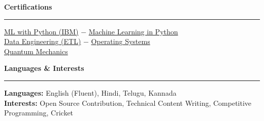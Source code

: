 \documentclass[10pt,letterpaper]{article}
\newcommand{\sectionheader}[1]{%
    \vspace{5pt}
    \textbf{\large #1}
    \vspace{-8pt}
    \par\noindent\rule{\textwidth}{0.4pt}\vspace{3pt}
}
\begin{document}
\sectionheader{Certifications}
\href{https://coursera.org/verify/7M3WRAJNI9TW}{ML with Python (IBM)} \quad $-$ \quad \href{https://coursera.org/verify/OM9A7NEWQT8I}{Machine Learning in Python}\\[3pt]
\href{https://coursera.org/verify/Q866X9O2C7FT}{Data Engineering (ETL)} \quad $-$ \quad \href{https://coursera.org/verify/42DE6OZQR2XY}{Operating Systems}\\[3pt]
\href{https://coursera.org/verify/FX2ZKGRVPJOA}{Quantum Mechanics}

\sectionheader{Languages \& Interests}
\textbf{Languages:} English (Fluent), Hindi, Telugu, Kannada\\[2pt]
\textbf{Interests:} Open Source Contribution, Technical Content Writing, Competitive Programming, Cricket
\end{document}
